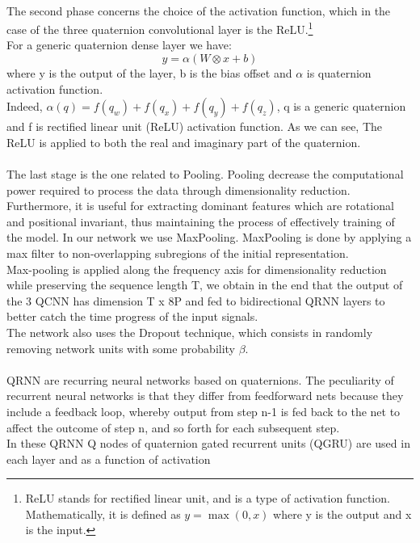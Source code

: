 \documentclass{article}
\begin{document}
    \\ The second phase concerns the choice of the activation function, which in the case of the three quaternion convolutional layer 
    is the ReLU.\footnote{ReLU stands for rectified linear unit, and is a type of activation function. Mathematically, it is defined 
    as $y = \max(0, x)$ where y is the output and x is the input.}
    \\ For a generic quaternion dense layer we have:
    \begin{equation*}
        y = \alpha( W \otimes x + b)
    \end{equation*}
    where  y is the output of the layer, b is the bias offset and $\alpha$ is quaternion activation function.
    \\ Indeed,  $\alpha(q) = f(q_w) + f(q_x) + f(q_y) + f(q_z)$, q is a generic quaternion and f is rectified linear unit (ReLU) 
    activation function. As we can see, The ReLU is applied to both the real and imaginary part of the quaternion.
    \\ \\ The last stage is the one related to Pooling. Pooling decrease the computational power required to process the data through 
    dimensionality reduction. Furthermore, it is useful for extracting dominant features which are rotational and positional invariant,
    thus maintaining the process of effectively training of the model. In our network we use MaxPooling.
    MaxPooling is done by applying a max filter to non-overlapping subregions of the initial representation.
    \\ Max-pooling is applied along the frequency axis for 
    dimensionality reduction while preserving the sequence length T, we obtain in the end that the output of the 3 QCNN has 
    dimension T x 8P and fed to bidirectional QRNN layers to better catch the time progress of the input signals.  
    \\ The network also uses the Dropout technique, which consists in randomly removing network units with some probability $\beta$.
    \\ \\ QRNN are recurring neural networks based on quaternions.
    The peculiarity of recurrent neural networks is that they differ from feedforward nets because they include a feedback loop,
    whereby output from step n-1 is fed back to the net to affect the outcome of step n, and so forth for each subsequent step.
    \\ In these QRNN Q nodes of quaternion gated recurrent units (QGRU) are used in each layer and as a function of activation
\end{document}
